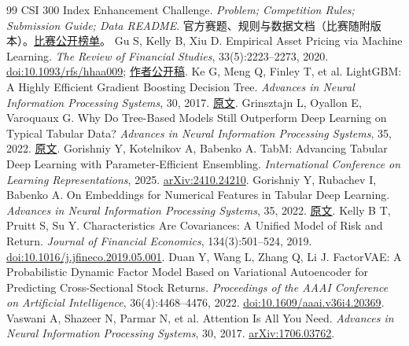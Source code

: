 \documentclass[UTF8,11pt,a4paper,fontset=fandol]{ctexart}
\begin{document}
\begin{thebibliography}{99}\small
\setlength{\itemsep}{0pt}\setlength{\parsep}{0pt}\linespread{1.0}\selectfont
{} CSI 300 Index Enhancement Challenge. \emph{Problem; Competition Rules; Submission Guide; Data README}. 官方赛题、规则与数据文档（比赛随附版本）。\href{https://datatech.geekpie.club/c/csi300-2026/leaderboard}{比赛公开榜单}。
 Gu S, Kelly B, Xiu D. Empirical Asset Pricing via Machine Learning. \emph{The Review of Financial Studies}, 33(5):2223--2273, 2020. \href{https://doi.org/10.1093/rfs/hhaa009}{doi:10.1093/rfs/hhaa009}; \href{https://dachxiu.chicagobooth.edu/download/ML_BKP.pdf}{作者公开稿}.
 Ke G, Meng Q, Finley T, et al. LightGBM: A Highly Efficient Gradient Boosting Decision Tree. \emph{Advances in Neural Information Processing Systems}, 30, 2017. \href{https://proceedings.neurips.cc/paper_files/paper/2017/hash/6449f44a102fde848669bdd9eb6b76fa-Abstract.html}{原文}.
 Grinsztajn L, Oyallon E, Varoquaux G. Why Do Tree-Based Models Still Outperform Deep Learning on Typical Tabular Data? \emph{Advances in Neural Information Processing Systems}, 35, 2022. \href{https://proceedings.neurips.cc/paper_files/paper/2022/hash/0378c7692da36807bdec87ab043cdadc-Abstract-Datasets_and_Benchmarks.html}{原文}.
 Gorishniy Y, Kotelnikov A, Babenko A. TabM: Advancing Tabular Deep Learning with Parameter-Efficient Ensembling. \emph{International Conference on Learning Representations}, 2025. \href{https://arxiv.org/abs/2410.24210}{arXiv:2410.24210}.
 Gorishniy Y, Rubachev I, Babenko A. On Embeddings for Numerical Features in Tabular Deep Learning. \emph{Advances in Neural Information Processing Systems}, 35, 2022. \href{https://proceedings.nips.cc/paper_files/paper/2022/hash/9e9f0ffc3d836836ca96cbf8fe14b105-Abstract-Conference.html}{原文}.
 Kelly B T, Pruitt S, Su Y. Characteristics Are Covariances: A Unified Model of Risk and Return. \emph{Journal of Financial Economics}, 134(3):501--524, 2019. \href{https://doi.org/10.1016/j.jfineco.2019.05.001}{doi:10.1016/j.jfineco.2019.05.001}.
 Duan Y, Wang L, Zhang Q, Li J. FactorVAE: A Probabilistic Dynamic Factor Model Based on Variational Autoencoder for Predicting Cross-Sectional Stock Returns. \emph{Proceedings of the AAAI Conference on Artificial Intelligence}, 36(4):4468--4476, 2022. \href{https://doi.org/10.1609/aaai.v36i4.20369}{doi:10.1609/aaai.v36i4.20369}.
 Vaswani A, Shazeer N, Parmar N, et al. Attention Is All You Need. \emph{Advances in Neural Information Processing Systems}, 30, 2017. \href{https://arxiv.org/abs/1706.03762}{arXiv:1706.03762}.

\end{thebibliography}
\end{document}
